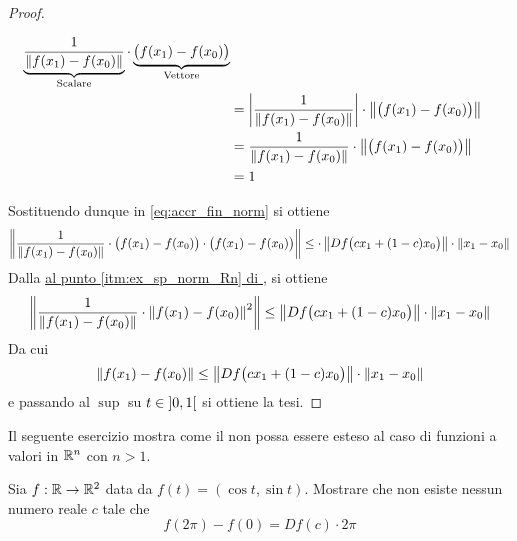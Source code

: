 \begin{theorem}
\begin{proof}
\begin{note}
\begin{align*}
{					\underbrace{\frac{1}{\left\|f(x_1) - f(x_0)\right\|}}_{\text{Scalare}}
					\cdot
					\underbrace{\bigl( f(x_1) - f(x_0) \bigr)}_{\text{Vettore}}
					}\\
				&= \left|\frac{1}{\left\|f(x_1) - f(x_0)\right\|}\right| \cdot \left\|\bigl( f(x_1) - f(x_0) \bigr)\right\|\\
				&= \frac{1}{\left\|f(x_1) - f(x_0)\right\|} \cdot \left\|\bigl( f(x_1) - f(x_0) \bigr)\right\|\\
				&= 1
			\end{align*}
		\end{note}
		Sostituendo dunque in \cref{eq:accr_fin_norm} si ottiene
		\[\left\|\frac{1}{\left\|f(x_1) - f(x_0)\right\|} \cdot \bigl( f(x_1) - f(x_0) \bigr) \cdot \bigl( f(x_1) - f(x_0) \bigr)\right\| \leq \cdot \left\|Df\bigl( cx_1 + (1-c)x_0 \bigr)\right\| \cdot \left\|x_1 - x_0\right\|\]
		Dalla \hyperlink{note:ex_sp_norm_Rn}{\notestyle{} al punto \ref*{itm:ex_sp_norm_Rn} di }, si ottiene
		\[\left\|\frac{1}{\left\|f(x_1) - f(x_0)\right\|} \cdot \left\|f(x_1) - f(x_0)\right\|^2\right\| \leq \left\|Df\bigl( cx_1 + (1-c)x_0 \bigr)\right\| \cdot \left\|x_1 - x_0\right\|\]
		Da cui
		\[\left\|f(x_1) - f(x_0)\right\| \leq \left\|Df\bigl( cx_1 + (1-c)x_0 \bigr)\right\| \cdot \left\|x_1 - x_0\right\|\]
		e passando al $\sup$ su $t \in \left]0,1\right[$ si ottiene la tesi.
	\end{proof}
\end{theorem}
Il seguente esercizio mostra come il  non possa essere esteso al caso di funzioni a valori in $\mathbb{R}^n$ con $n > 1$.
\begin{exercise}
	Sia $f: \mathbb{R} \to \mathbb{R}^2$ data da $f(t) = (\cos t, \sin t)$. Mostrare che non esiste nessun numero reale $c$ tale che
	\[f(2 \pi) - f(0) = Df(c) \cdot 2 \pi\]
\end{exercise}

